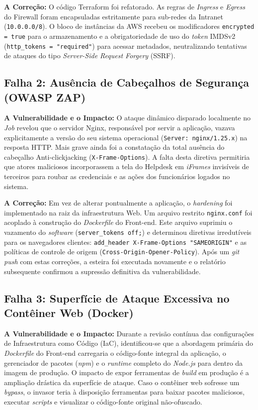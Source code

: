 \documentclass[12pt, a4paper]{article}
\begin{document}
\textbf{A Correção:} O código Terraform foi refatorado. As regras de \textit{Ingress} e \textit{Egress} do Firewall foram encapsuladas estritamente para sub-redes da Intranet (\texttt{10.0.0.0/8}). O bloco de instâncias da AWS recebeu os modificadores \texttt{encrypted = true} para o armazenamento e a obrigatoriedade de uso do \textit{token} IMDSv2 (\texttt{http\_tokens = "required"}) para acessar metadados, neutralizando tentativas de ataques do tipo \textit{Server-Side Request Forgery} (SSRF).

\subsection{Falha 2: Ausência de Cabeçalhos de Segurança (OWASP ZAP)}
\textbf{A Vulnerabilidade e o Impacto:} O ataque dinâmico disparado localmente no \textit{Job} revelou que o servidor Nginx, responsável por servir a aplicação, vazava explicitamente a versão do seu sistema operacional (\texttt{Server: nginx/1.25.x}) na resposta HTTP. Mais grave ainda foi a constatação da total ausência do cabeçalho Anti-clickjacking (\texttt{X-Frame-Options}). A falta desta diretiva permitiria que atores maliciosos incorporassem a tela do Helpdesk em \textit{iFrames} invisíveis de terceiros para roubar as credenciais e as ações dos funcionários logados no sistema.

\textbf{A Correção:} Em vez de alterar pontualmente a aplicação, o \textit{hardening} foi implementado na raiz da infraestrutura Web. Um arquivo restrito \texttt{nginx.conf} foi acoplado à construção do \textit{Dockerfile} do Front-end. Este arquivo suprimiu o vazamento do \textit{software} (\texttt{server\_tokens off;}) e determinou diretivas irredutíveis para os navegadores clientes: \texttt{add\_header X-Frame-Options "SAMEORIGIN"} e as políticas de controle de origem (\texttt{Cross-Origin-Opener-Policy}). Após um \textit{git push} com estas correções, a esteira foi executada novamente e o relatório subsequente confirmou a supressão definitiva da vulnerabilidade.

\subsection{Falha 3: Superfície de Ataque Excessiva no Contêiner Web (Docker)}
\textbf{A Vulnerabilidade e o Impacto:} Durante a revisão contínua das configurações de Infraestrutura como Código (IaC), identificou-se que a abordagem primária do \textit{Dockerfile} do Front-end carregaria o código-fonte integral da aplicação, o gerenciador de pacotes (\textit{npm}) e o \textit{runtime} completo do \textit{Node.js} para dentro da imagem de produção. O impacto de expor ferramentas de \textit{build} em produção é a ampliação drástica da superfície de ataque. Caso o contêiner web sofresse um \textit{bypass}, o invasor teria à disposição ferramentas para baixar pacotes maliciosos, executar \textit{scripts} e visualizar o código-fonte original não-ofuscado.
\end{document}
